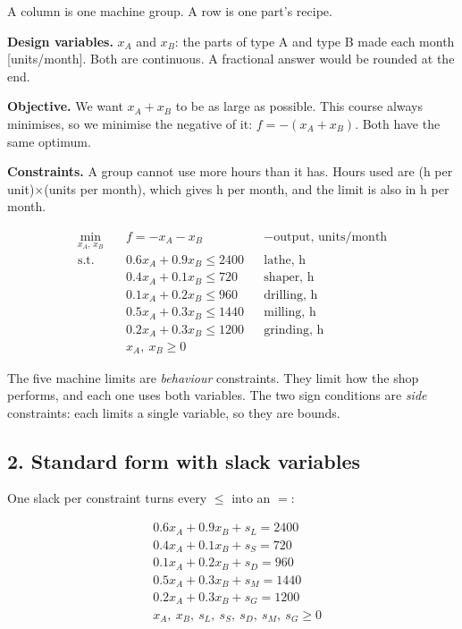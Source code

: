 \documentclass[11pt,a4paper]{article}
\begin{document}
A column is one machine group. A row is one part's recipe.

\textbf{Design variables.} $x_A$ and $x_B$: the parts of type A and type B made
each month [units/month]. Both are continuous. A fractional answer would be
rounded at the end.

\textbf{Objective.} We want $x_A + x_B$ to be as large as possible. This course
always minimises, so we minimise the negative of it: $f = -(x_A + x_B)$. Both
have the same optimum.

\textbf{Constraints.} A group cannot use more hours than it has. Hours used are
(h per unit)$\times$(units per month), which gives h per month, and the limit is
also in h per month.

\begin{align*}
  \min_{x_A,\,x_B} \quad & f = -x_A - x_B && \text{$-$output, units/month} \\
  \text{s.t.} \quad
  & 0.6x_A + 0.9x_B \le 2400 && \text{lathe, h} \\
  & 0.4x_A + 0.1x_B \le 720  && \text{shaper, h} \\
  & 0.1x_A + 0.2x_B \le 960  && \text{drilling, h} \\
  & 0.5x_A + 0.3x_B \le 1440 && \text{milling, h} \\
  & 0.2x_A + 0.3x_B \le 1200 && \text{grinding, h} \\
  & x_A,\ x_B \ge 0
\end{align*}

The five machine limits are \emph{behaviour} constraints. They limit how the
shop performs, and each one uses both variables. The two sign conditions are
\emph{side} constraints: each limits a single variable, so they are bounds.

\subsection*{2. Standard form with slack variables}

One slack per constraint turns every $\le$ into an $=$:

\begin{align*}
  & 0.6x_A + 0.9x_B + s_L = 2400 \\
  & 0.4x_A + 0.1x_B + s_S = 720 \\
  & 0.1x_A + 0.2x_B + s_D = 960 \\
  & 0.5x_A + 0.3x_B + s_M = 1440 \\
  & 0.2x_A + 0.3x_B + s_G = 1200 \\
  & x_A,\ x_B,\ s_L,\ s_S,\ s_D,\ s_M,\ s_G \ge 0
\end{align*}
\end{document}
